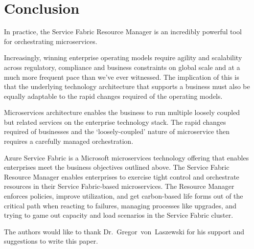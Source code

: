 \section{Conclusion}
In practice, the Service Fabric Resource Manager is an incredibly
powerful tool for orchestrating microservices.

Increasingly, winning enterprise operating models require agility and
scalability across regulatory, compliance and business constraints on
global scale and at a much more frequent pace than we’ve ever
witnessed. The implication of this is that the underlying technology
architecture that supports a business must also be equally adaptable
to the rapid changes required of the operating models.

Microservices architecture enables the business to run multiple
loosely coupled but related services on the enterprise technology
stack. The rapid changes required of businesses and the
‘loosely-coupled’ nature of microservice then requires a carefully
managed orchestration.

Azure Service Fabric is a Microsoft microservices technology offering
that enables enterprises meet the business objectives outlined
above. The Service Fabric Resource Manager enables enterprises to
exercise tight control and orchestrate resources in their Service
Fabric-based microservices. The Resource Manager enforces policies,
improve utilization, and get carbon-based life forms out of the
critical path when reacting to failures, managing processes like
upgrades, and trying to game out capacity and load scenarios in the
Service Fabric cluster.


\begin{acks}

  The authors would like to thank Dr.~Gregor~von~Laszewski for his
  support and suggestions to write this paper.

\end{acks}



